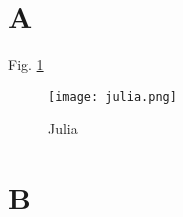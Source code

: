 \section{A}
\lipsum[2]

Fig. \ref{fig:julia}\autocite{2017arXiv171005832T}

\begin{figure}
    \label{fig:julia}
    \centering
    \texttt{[image: julia.png]}
    \caption{Julia}
\end{figure}

\section{B}
\lipsum[2]
